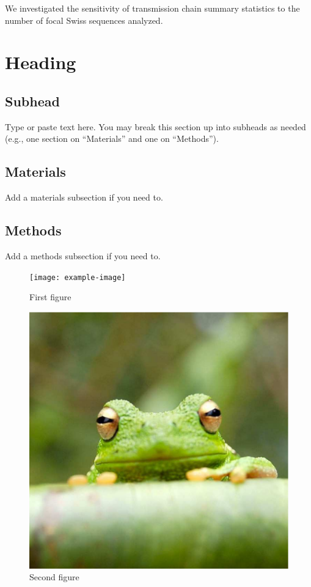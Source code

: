 \documentclass[9pt,twoside,lineno]{pnas-new}
\begin{document}
We investigated the sensitivity of transmission chain summary statistics to the number of focal Swiss sequences analyzed.


\section*{Heading}
\subsection*{Subhead}
Type or paste text here. You may break this section up into subheads as needed (e.g., one section on ``Materials'' and one on ``Methods'').

\subsection*{Materials}
Add a materials subsection if you need to.

\subsection*{Methods}
Add a methods subsection if you need to.


\begin{figure}
\centering
\texttt{[image: example-image]}
\caption{First figure}
\end{figure}

\begin{figure}
\centering
\includegraphics[width=\textwidth]{frog}
\caption{Second figure}
\end{figure}
\end{document}
